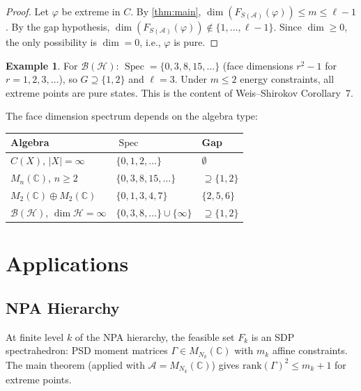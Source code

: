 \documentclass[11pt,a4paper]{article}
\theoremstyle{plain}
\theoremstyle{definition}
\newtheorem{example}[theorem]{Example}
\theoremstyle{remark}
\newcommand{\C}{\mathbb{C}}
\newcommand{\Hilbert}{\mathcal{H}}
\newcommand{\BH}{\mathcal{B}(\Hilbert)}
\newcommand{\rank}{\mathrm{rank}}
\newcommand{\abs}[1]{|#1|}
\DeclareMathOperator{\Spec}{Spec}
\begin{document}
\begin{proof}
Let $\varphi$ be extreme in $C$. By \cref{thm:main},
$\dim(F_{S(\mathcal{A})}(\varphi)) \le m \le \ell - 1$.
By the gap hypothesis,
$\dim(F_{S(\mathcal{A})}(\varphi)) \notin \{1, \ldots, \ell - 1\}$.
Since $\dim \ge 0$, the only possibility is $\dim = 0$, i.e.,
$\varphi$ is pure.
\end{proof}

\begin{example}
For $\BH$: $\Spec = \{0, 3, 8, 15, \ldots\}$
(face dimensions $r^2 - 1$ for $r = 1, 2, 3, \ldots$), so
$G \supseteq \{1, 2\}$ and $\ell = 3$. Under $m \le 2$ energy
constraints, all extreme points are pure states.
This is the content of Weis--Shirokov Corollary~7.
\end{example}

The face dimension spectrum depends on the algebra type:

\begin{center}
\begin{tabular}{lll}
\toprule
\textbf{Algebra} & $\Spec$ & \textbf{Gap} \\
\midrule
$C(X)$, $\abs{X} = \infty$ & $\{0, 1, 2, \ldots\}$ & $\emptyset$ \\
$M_n(\C)$, $n \ge 2$ & $\{0, 3, 8, 15, \ldots\}$ & $\supseteq \{1, 2\}$ \\
$M_2(\C) \oplus M_2(\C)$ & $\{0, 1, 3, 4, 7\}$ & $\{2, 5, 6\}$ \\
$\BH$, $\dim\Hilbert = \infty$ & $\{0, 3, 8, \ldots\} \cup \{\infty\}$
& $\supseteq \{1, 2\}$ \\
\bottomrule
\end{tabular}
\end{center}


\section{Applications}
\label{sec:applications}

\subsection{NPA Hierarchy}
\label{sec:npa}

At finite level $k$ of the NPA hierarchy, the feasible set $F_k$ is
an SDP spectrahedron: PSD moment matrices $\Gamma \in M_{N_k}(\C)$
with $m_k$ affine constraints. The main theorem (applied with
$\mathcal{A} = M_{N_k}(\C)$) gives
$\rank(\Gamma)^2 \le m_k + 1$ for extreme points.
\end{document}
